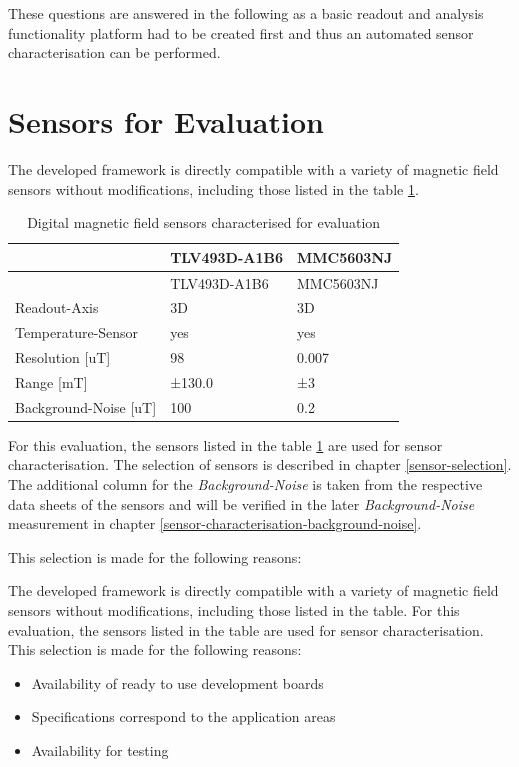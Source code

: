 These questions are answered in the following as a basic readout and
analysis functionality platform had to be created first and thus an
automated sensor characterisation can be performed.

\hypertarget{sensors-for-evaluation}{%
\section{Sensors for Evaluation}\label{sensors-for-evaluation}}

The developed framework is directly compatible with a variety of
magnetic field sensors without modifications, including those listed in
the table
\ref{Digital_magnetic_field_sensors_characterised_for_evaluation.csv}.

\begin{longtable}[]{@{}lll@{}}
\caption{Digital magnetic field sensors characterised for evaluation
\label{Digital_magnetic_field_sensors_characterised_for_evaluation.csv}}\tabularnewline
\toprule
& TLV493D-A1B6 & MMC5603NJ\tabularnewline
\midrule
\endfirsthead
\toprule
& TLV493D-A1B6 & MMC5603NJ\tabularnewline
\midrule
\endhead
Readout-Axis & 3D & 3D\tabularnewline
Temperature-Sensor & yes & yes\tabularnewline
Resolution {[}uT{]} & 98 & 0.007\tabularnewline
Range {[}mT{]} & ±130.0 & ±3\tabularnewline
Background-Noise {[}uT{]} & 100 & 0.2\tabularnewline
\bottomrule
\end{longtable}

For this evaluation, the sensors listed in the table
\ref{Digital_magnetic_field_sensors_characterised_for_evaluation.csv}
are used for sensor characterisation. The selection of sensors is
described in chapter \ref{sensor-selection}. The additional column for
the \emph{Background-Noise} is taken from the respective data sheets of
the sensors and will be verified in the later \emph{Background-Noise}
measurement in chapter \ref{sensor-characterisation-background-noise}.

This selection is made for the following reasons:

The developed framework is directly compatible with a variety of
magnetic field sensors without modifications, including those listed in
the table. For this evaluation, the sensors listed in the table are used
for sensor characterisation. This selection is made for the following
reasons:

\begin{itemize}
\tightlist
\item
  Availability of ready to use development boards
\item
  Specifications correspond to the application areas
\item
  Availability for testing
\end{itemize}

